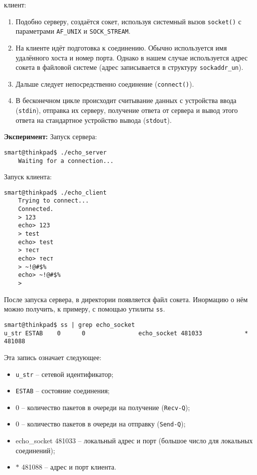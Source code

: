 клиент:
\begin{enumerate}
\item Подобно серверу, создаётся сокет, используя системный вызов \texttt{socket()} с параметрами \texttt{AF\_UNIX} и \texttt{SOCK\_STREAM}.
\item На клиенте идёт подготовка к соединению. Обычно используется имя удалённого хоста и номер порта. Однако в нашем случае используется адрес сокета в файловой системе (адрес записывается в структуру \texttt{sockaddr\_un}).
\item Дальше следует непосредственно соединение (\texttt{connect()}).
\item В бесконечном цикле происходит считывание данных с устройства ввода (\texttt{stdin}), отправка их серверу, получение ответа от сервера и вывод этого ответа на стандартное устройство вывода (\texttt{stdout}).
\end{enumerate}

\textbf{Эксперимент:} Запуск сервера:
\begin{Verbatim}[frame=single]
    smart@thinkpad$ ./echo_server
    Waiting for a connection...
\end{Verbatim}

Запуск клиента:
\begin{Verbatim}[frame=single]
    smart@thinkpad$ ./echo_client
    Trying to connect...
    Connected.
    > 123
    echo> 123
    > test
    echo> test
    > тест
    echo> тест
    > ~!@#$%
    echo> ~!@#$%
    > 
\end{Verbatim}

После запуска сервера, в директории появляется файл сокета. Инормацию о нём можно получить, к примеру, с помощью утилиты \texttt{ss}.
\begin{Verbatim}[frame=single]
smart@thinkpad$ ss | grep echo_socket
u_str ESTAB    0      0               echo_socket 481033            * 481088
\end{Verbatim}
Эта запись означает следующее:
\begin{itemize}
    \item \texttt{u\_str} -- сетевой идентификатор;
    \item \texttt{ESTAB} -- состояние соединения;
    \item 0 -- количество пакетов в очереди на получение (\texttt{Recv-Q});
    \item 0 -- количество пакетов в очереди на отправку (\texttt{Send-Q});
    \item echo\_socket 481033 -- локальный адрес и порт (большое число для локальных соединений);
    \item $\ast{}$ 481088 -- адрес и порт клиента.
\end{itemize}


